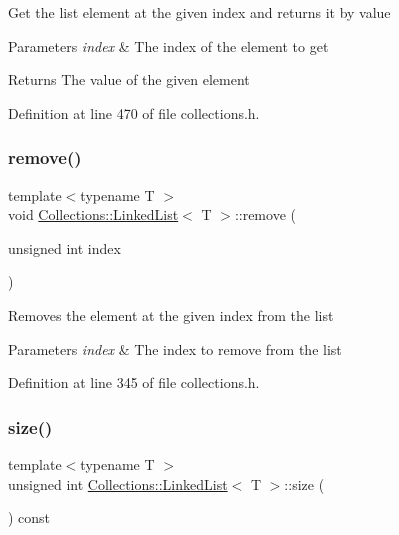 Get the list element at the given index and returns it by value 
\begin{DoxyParams}{Parameters}
{\em index} & The index of the element to get \\
\hline
\end{DoxyParams}
\begin{DoxyReturn}{Returns}
The value of the given element 
\end{DoxyReturn}


Definition at line 470 of file collections.\+h.

\hypertarget{class_collections_1_1_linked_list_af7199bf3dcefa095a606fbd10df6867a}{}\label{class_collections_1_1_linked_list_af7199bf3dcefa095a606fbd10df6867a} 
\subsubsection{\texorpdfstring{remove()}{remove()}}
{\footnotesize\ttfamily template$<$typename T $>$ \\
void \hyperlink{class_collections_1_1_linked_list}{Collections\+::\+Linked\+List}$<$ T $>$\+::remove (\begin{DoxyParamCaption}\item[{unsigned int}]{index }\end{DoxyParamCaption})}

Removes the element at the given index from the list 
\begin{DoxyParams}{Parameters}
{\em index} & The index to remove from the list \\
\hline
\end{DoxyParams}


Definition at line 345 of file collections.\+h.

\hypertarget{class_collections_1_1_linked_list_a4e8745c011b11dfba9e15ea58959b99a}{}\label{class_collections_1_1_linked_list_a4e8745c011b11dfba9e15ea58959b99a} 
\subsubsection{\texorpdfstring{size()}{size()}}
{\footnotesize\ttfamily template$<$typename T $>$ \\
unsigned int \hyperlink{class_collections_1_1_linked_list}{Collections\+::\+Linked\+List}$<$ T $>$\+::size (\begin{DoxyParamCaption}{ }\end{DoxyParamCaption}) const}

